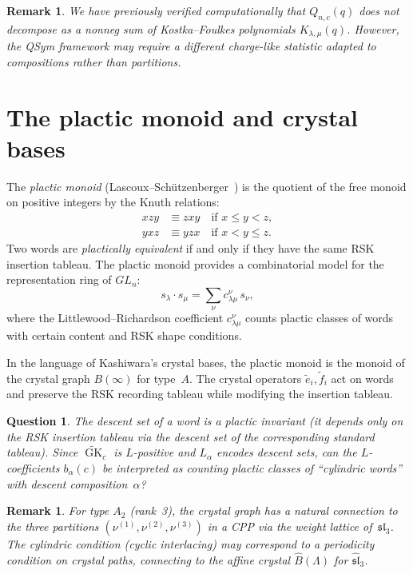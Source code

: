 \documentclass[11pt]{article}
\newtheorem{remark}[theorem]{Remark}
\newtheorem{question}[theorem]{Question}
\newcommand{\GK}{\operatorname{GK}}
\begin{document}
\begin{remark}
We have previously verified computationally that $Q_{n,c}(q)$
does \emph{not} decompose as a nonneg sum of Kostka--Foulkes
polynomials $K_{\lambda,\mu}(q)$. However, the QSym framework
may require a \emph{different} charge-like statistic adapted to
compositions rather than partitions.
\end{remark}

\section{The plactic monoid and crystal bases}
\label{sec:plactic}

The \emph{plactic monoid} (Lascoux--Sch\"utzenberger~\cite{LS81})
is the quotient of the free monoid on positive integers by the
Knuth relations:
\begin{align*}
  xzy &\equiv zxy \quad \text{if } x \leq y < z, \\
  yxz &\equiv yzx \quad \text{if } x < y \leq z.
\end{align*}
Two words are \emph{plactically equivalent} if and only if they
have the same RSK insertion tableau. The plactic monoid provides
a combinatorial model for the representation ring of $GL_n$:
\[
  s_\lambda \cdot s_\mu = \sum_\nu c^\nu_{\lambda\mu}\, s_\nu,
\]
where the Littlewood--Richardson coefficient $c^\nu_{\lambda\mu}$
counts plactic classes of words with certain content and
RSK shape conditions.

In the language of Kashiwara's crystal bases, the plactic monoid
is the monoid of the crystal graph $B(\infty)$ for type~$A$.
The crystal operators $\tilde{e}_i, \tilde{f}_i$ act on words
and preserve the RSK recording tableau while modifying the
insertion tableau.

\begin{question}
The descent set of a word is a plactic invariant (it depends only
on the RSK insertion tableau via the descent set of the
corresponding standard tableau). Since $\widetilde{\GK}_c$ is
$L$-positive and $L_\alpha$ encodes descent sets, can the
$L$-coefficients $b_\alpha(c)$ be interpreted as counting
plactic classes of ``cylindric words'' with descent
composition~$\alpha$?
\end{question}

\begin{remark}
For type $A_2$ (rank~3), the crystal graph has a natural
connection to the three partitions $(\nu^{(1)}, \nu^{(2)},
\nu^{(3)})$ in a CPP via the weight lattice of~$\mathfrak{sl}_3$.
The cylindric condition (cyclic interlacing) may correspond to
a periodicity condition on crystal paths, connecting to the
\emph{affine} crystal $\widehat{B}(\Lambda)$ for
$\widehat{\mathfrak{sl}}_3$.
\end{remark}
\end{document}
